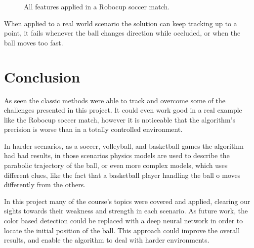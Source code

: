 \documentclass[10pt,twocolumn,letterpaper]{article}
\begin{document}
  \begin{figure}[!h]
    \centering
    \setlength{\fboxsep}{1pt}
    \setlength{\fboxrule}{1pt}
    \caption{All features applied in a Robocup soccer match.}\label{fig:robocup_1}
  \end{figure}

  When applied to a real world scenario the solution can keep tracking up to a
  point, it fails whenever the ball changes direction while occluded, or when
  the ball moves too fast.

\section{Conclusion}

 As seen the classic methods were able to track and overcome some of the
  challenges presented in this project. It could even work good in a real example like the Robocup soccer match, however it is noticeable that the algorithm's precision is worse than in a totally controlled environment. 
  
  In harder scenarios, as a soccer, volleyball, and basketball games the algorithm had  bad results, in those scenarios physics models are used to describe the parabolic trajectory of the ball, or even  more complex models, which uses different clues, like the fact that a basketball player handling the ball o moves differently from the others.
  
  In this project  many of the course's topics were covered and applied, clearing our sights towards their weakness and strength in each scenario. As future work, the color based detection could be replaced with a deep neural network in order to locate the initial position of the ball. This approach could improve the overall results, and enable the algorithm to deal with harder environments.

{\small


}
\end{document}
